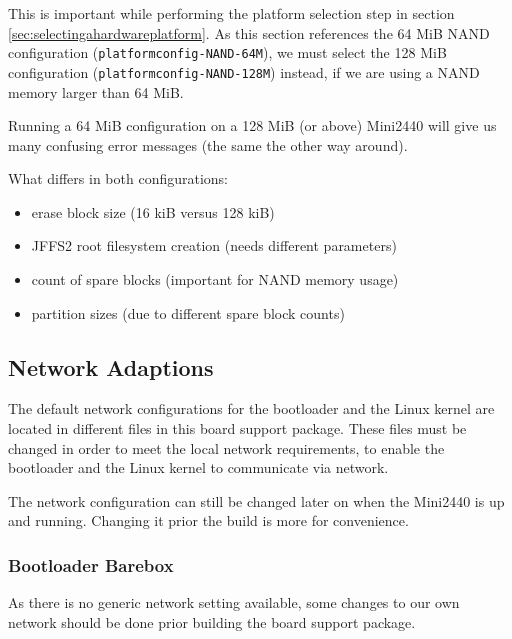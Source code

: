 This is important while performing the platform selection step in section
\ref{sec:selectingahardwareplatform}.
As this section references the 64 MiB NAND configuration
(\texttt{platformconfig-NAND-64M}), we must select the 128 MiB configuration
(\texttt{platformconfig-NAND-128M}) instead, if we are using a NAND memory
larger than 64 MiB.

\begin{important}
Running a 64 MiB configuration on a 128 MiB (or above) Mini2440 will
give us many confusing error messages (the same the other way around).
\end{important}

What differs in both configurations:
\begin{itemize}
 \item erase block size (16 kiB versus 128 kiB)
 \item JFFS2 root filesystem creation (needs different parameters)
 \item count of spare blocks (important for NAND memory usage)
 \item partition sizes (due to different spare block counts)
\end{itemize}

\subsection{Network Adaptions}		\label{sec:networkadaptions}

The default network configurations for the bootloader and the Linux kernel are
located in different files in this board support package. These files must be
changed in order to meet the local network requirements, to enable the
bootloader and the Linux kernel to communicate via network.

\begin{important}
The network configuration can still be changed later on when the Mini2440 is
up and running. Changing it prior the build is more for convenience.
\end{important}

\subsubsection{Bootloader Barebox}		\label{sec:bootloadernetwork}

As there is no generic network setting available, some changes to our own
network should be done prior building the board support package.

